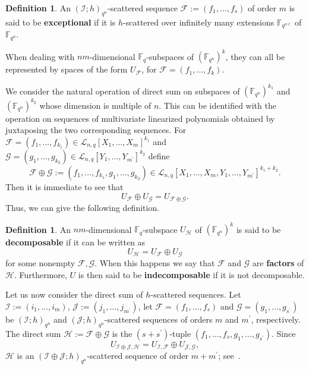 \documentclass[11pt]{article}
\theoremstyle{definition}
\newtheorem{defi}[theo]{Definition}
\numberwithin{equation}{section}
\begin{document}
\begin{defi}\label{Def:ExceptionalScatteredSequence}
An $(\mathcal I;h)_{q^n}$-scattered sequence  $\mathcal{F}:=(f_1,\ldots,f_s)$ of order $m$  is said to be \textbf{exceptional} if it is $h$-scattered over infinitely many extensions $\mathbb{F}_{q^{n\ell}}$ of $\mathbb{F}_{q^n}$.
\end{defi}

When dealing with $nm$-dimensional $\mathbb{F}_q$-subspaces of $(\mathbb{F}_{q^n})^k$, they can all be represented by spaces of the form $U_{\mathcal F}$, for $\mathcal F=(f_1,\ldots,f_k)$.

We consider the natural operation of direct sum on subspaces of $(\mathbb{F}_{q^n})^{k_1}$ and $(\mathbb{F}_{q^n})^{k_2}$ whose dimension is multiple of $n$. This can be identified with the operation on sequences of multivariate linearized polynomials obtained by juxtaposing the two corresponding sequences. 
For $\mathcal F =(f_1,\ldots,f_{k_1})\in \mathcal{L}_{n,q}[X_1,\ldots,X_{m}]^{k_1}$ and $\mathcal G =(g_1,\ldots,g_{k_2})\in \mathcal{L}_{n,q}[Y_1,\ldots,Y_{m^{\prime}}]^{k_2}$ define $$\mathcal F \oplus \mathcal G:=(f_1,\ldots, f_{k_1},g_1,\ldots,g_{k_2})\in \mathcal{L}_{n,q}[X_1,\ldots,X_{m},Y_1,\ldots,Y_{m^{\prime}}]^{k_1+k_2}.$$ Then it is immediate to see that
$$ U_{\mathcal F} \oplus U_{\mathcal G} = U_{\mathcal{F}\oplus \mathcal{G}}.$$
 Thus, we can give the following definition.

\begin{defi}\label{def:decompoasable}
 An $nm$-dimensional $\mathbb{F}_q$-subspace $U_{\mathcal{H}}$ of $(\mathbb{F}_{q^n})^k$   is said to be \textbf{decomposable} if it can be written as
 $$U_{\mathcal{H}}=U_{\mathcal F}\oplus U_{\mathcal G}$$
 for some nonempty $\mathcal F, \mathcal G$. 
 When this happens we say that $\mathcal{F}$ and $\mathcal{G}$ are \textbf{factors} of $\mathcal{H}$. Furthermore, 
 $U$ is then said to be \textbf{indecomposable} if it is not decomposable. 
\end{defi}

Let us now consider the direct sum of $h$-scattered sequences.
Let $\mathcal I:=(i_1,\ldots,i_m)$, $\mathcal J:=(j_1,\ldots,j_{m^{\prime}})$, let $\mathcal{F}=(f_1,\ldots,f_{s})$ and $\mathcal{G}=(g_1,\ldots,g_{s^{\prime}})$ be $(\mathcal I;h)_{{q^n}}$ and $(\mathcal J;h)_{{q^n}}$-scattered sequences of orders $m$ and $m^{\prime}$, respectively.
The {direct sum} $\mathcal{H}:=\mathcal{F}\oplus \mathcal{G}$ is the $(s+s^{\prime})$-tuple $(f_1,\ldots,f_s,g_1,\ldots,g_{s^{\prime}})$. Since 
$$U_{\mathcal I\oplus\mathcal J,\mathcal{H}}=U_{\mathcal I,\mathcal{F}}\oplus U_{\mathcal J,\mathcal{G}},$$
$\mathcal{H}$ is an $(\mathcal I \oplus \mathcal J;h)_{q^{n}}$-scattered sequence of order $m+m^{\prime}$; see~\cite{BGMP,csajbok2021generalising}. 
\end{document}
